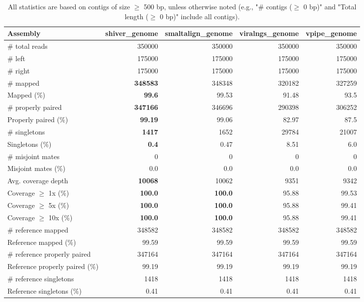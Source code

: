 \documentclass[12pt,a4paper]{article}
\begin{document}
\begin{table}[ht]
\begin{center}
\caption{All statistics are based on contigs of size $\geq$ 500 bp, unless otherwise noted (e.g., "\# contigs ($\geq$ 0 bp)" and "Total length ($\geq$ 0 bp)" include all contigs).}
\begin{tabular}{|l*{4}{|r}|}
\hline
Assembly & shiver\_genome & smaltalign\_genome & viralngs\_genome & vpipe\_genome \\ \hline
\# total reads & 350000 & 350000 & 350000 & 350000 \\ \hline
\# left & 175000 & 175000 & 175000 & 175000 \\ \hline
\# right & 175000 & 175000 & 175000 & 175000 \\ \hline
\# mapped & {\bf 348583} & 348348 & 320182 & 327259 \\ \hline
Mapped (\%) & {\bf 99.6} & 99.53 & 91.48 & 93.5 \\ \hline
\# properly paired & {\bf 347166} & 346696 & 290398 & 306252 \\ \hline
Properly paired (\%) & {\bf 99.19} & 99.06 & 82.97 & 87.5 \\ \hline
\# singletons & {\bf 1417} & 1652 & 29784 & 21007 \\ \hline
Singletons (\%) & {\bf 0.4} & 0.47 & 8.51 & 6.0 \\ \hline
\# misjoint mates & 0 & 0 & 0 & 0 \\ \hline
Misjoint mates (\%) & 0.0 & 0.0 & 0.0 & 0.0 \\ \hline
Avg. coverage depth & {\bf 10068} & 10062 & 9351 & 9342 \\ \hline
Coverage $\geq$ 1x (\%) & {\bf 100.0} & {\bf 100.0} & 95.88 & 99.53 \\ \hline
Coverage $\geq$ 5x (\%) & {\bf 100.0} & {\bf 100.0} & 95.88 & 99.41 \\ \hline
Coverage $\geq$ 10x (\%) & {\bf 100.0} & {\bf 100.0} & 95.88 & 99.41 \\ \hline
\# reference mapped & 348582 & 348582 & 348582 & 348582 \\ \hline
Reference mapped (\%) & 99.59 & 99.59 & 99.59 & 99.59 \\ \hline
\# reference properly paired & 347164 & 347164 & 347164 & 347164 \\ \hline
Reference properly paired (\%) & 99.19 & 99.19 & 99.19 & 99.19 \\ \hline
\# reference singletons & 1418 & 1418 & 1418 & 1418 \\ \hline
Reference singletons (\%) & 0.41 & 0.41 & 0.41 & 0.41 \\ \hline

\end{tabular}
\end{center}
\end{table}
\end{document}

